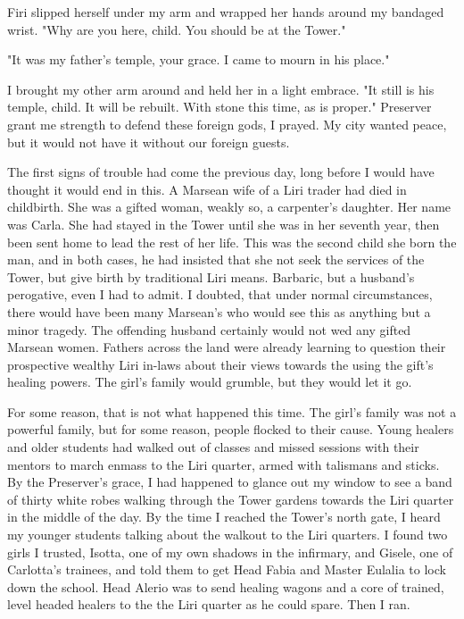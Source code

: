 \documentclass{article}
\begin{document}
Firi slipped herself under my arm and wrapped her hands around my bandaged wrist. "Why are you here, child. You should be at the Tower."

"It was my father's temple, your grace. I came to mourn in his place."

I brought my other arm around and held her in a light embrace. "It still is his temple, child. It will be rebuilt. With stone this time, as is proper." Preserver grant me strength to defend these foreign gods, I prayed. My city wanted peace, but it would not have it without our foreign guests.

The first signs of trouble had come the previous day, long before I would have thought it would end in this. A Marsean wife of a Liri trader had died in childbirth. She was a gifted woman, weakly so, a carpenter's daughter. Her name was Carla. She had stayed in the Tower until she was in her seventh year, then been sent home to lead the rest of her life. This was the second child she born the man, and in both cases, he had insisted that she not seek the services of the Tower, but give birth by traditional Liri means. Barbaric, but a husband's perogative, even I had to admit. I doubted, that under normal circumstances, there would have been many Marsean's who would see this as anything but a minor tragedy. The offending husband certainly would not wed any gifted Marsean women. Fathers across the land were already learning to question their prospective wealthy Liri in-laws about their views towards the using the gift's healing powers. The girl's family would grumble, but they would let it go. 

For some reason, that is not what happened this time. The girl's family was not a powerful family, but for some reason, people flocked to their cause. Young healers and older students had walked out of classes and missed sessions with their mentors to march enmass to the Liri quarter, armed with talismans and sticks. By the Preserver's grace, I had happened to glance out my window to see a band of thirty white robes walking through the Tower gardens towards the Liri quarter in the middle of the day. By the time I reached the Tower's north gate, I heard my younger students talking about the walkout to the Liri quarters. I found two girls I trusted, Isotta, one of my own shadows in the infirmary, and Gisele, one of Carlotta's trainees, and told them to get Head Fabia and Master Eulalia to lock down the school. Head Alerio was to send healing wagons and a core of trained, level headed healers to the the Liri quarter as he could spare. Then I ran.
\end{document}
